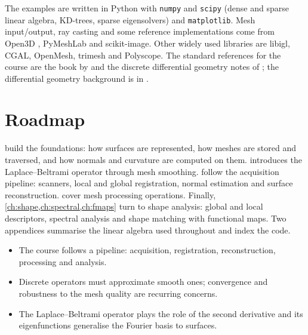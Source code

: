 The examples are written in Python with \texttt{numpy} and \texttt{scipy} (dense and sparse
linear algebra, KD-trees, sparse eigensolvers) and \texttt{matplotlib}. Mesh input/output, ray
casting and some reference implementations come from Open3D \citep{Zhou2018}, PyMeshLab
\citep{Cignoni2008} and scikit-image. Other widely used libraries are libigl, CGAL, OpenMesh,
trimesh and Polyscope. The standard references for the course are the book by
\citet{Botsch2010} and the discrete differential geometry notes of \citet{Crane2018}; the
differential geometry background is in \citet{doCarmo1976}.

\section{Roadmap}

 build the foundations: how surfaces are represented, how meshes
are stored and traversed, and how normals and curvature are computed on them.
 introduces the Laplace--Beltrami operator through mesh smoothing.
 follow the acquisition pipeline: scanners, local and
global registration, normal estimation and surface reconstruction.
 cover mesh processing operations. Finally,
\cref{ch:shape,ch:spectral,ch:fmaps} turn to shape analysis: global and local descriptors,
spectral analysis and shape matching with functional maps. Two appendices summarise the linear
algebra used throughout and index the code.

\begin{keypoints}
\begin{itemize}[leftmargin=*]
  \item The course follows a pipeline: acquisition, registration, reconstruction, processing and
  analysis.
  \item Discrete operators must approximate smooth ones; convergence and robustness to the mesh
  quality are recurring concerns.
  \item The Laplace--Beltrami operator plays the role of the second derivative and its
  eigenfunctions generalise the Fourier basis to surfaces.
\end{itemize}
\end{keypoints}
